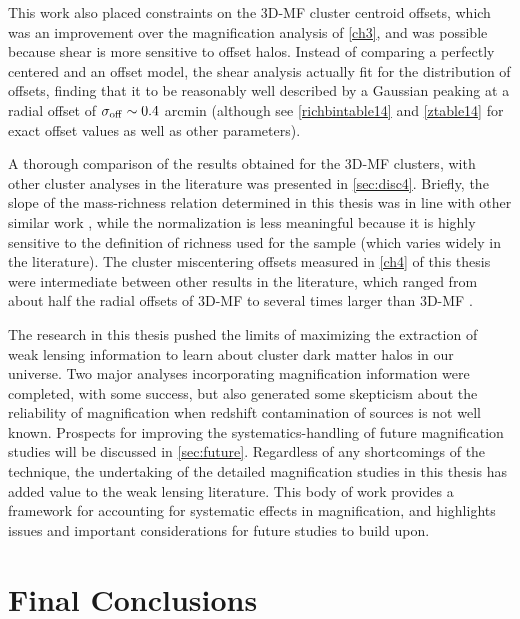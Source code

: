 This work also placed constraints on the \ac{3D-MF} cluster centroid offsets, which was an improvement over the magnification analysis of \autoref{ch3}, and was possible because shear is more sensitive to offset halos. Instead of comparing a perfectly centered and an offset model, the shear analysis actually fit for the distribution of offsets, finding that it to be reasonably well described by a Gaussian peaking at a radial offset of $\sigma_{\rm off} \sim 0.4$ arcmin (although see \autoref{richbintable14} and \autoref{ztable14} for exact offset values as well as other parameters). 

A thorough comparison of the results obtained for the \ac{3D-MF} clusters, with other cluster analyses in the literature was presented in \autoref{sec:disc4}. Briefly, the slope of the mass-richness relation determined in this thesis was in line with other similar work \citep{Wen12,Covone14}, while the normalization is less meaningful because it is highly sensitive to the definition of richness used for the sample (which varies widely in the literature). The cluster miscentering offsets measured in \autoref{ch4} of this thesis were intermediate between other results in the literature, which ranged from about half the radial offsets of \ac{3D-MF} \citep{George12} to several times larger than \ac{3D-MF} \citep{Johnston07}.

The research in this thesis pushed the limits of maximizing the extraction of weak lensing information to learn about cluster dark matter halos in our universe. Two major analyses incorporating magnification information were completed, with some success, but also generated some skepticism about the reliability of magnification when redshift contamination of sources is not well known. Prospects for improving the systematics-handling of future magnification studies will be discussed in \autoref{sec:future}. Regardless of any shortcomings of the technique, the undertaking of the detailed magnification studies in this thesis has added value to the weak lensing literature. This body of work provides a framework for accounting for systematic effects in magnification, and highlights issues and important considerations for future studies to build upon.


\section{Final Conclusions}
\label{sec:conc}

